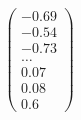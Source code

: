 \documentclass[preview]{standalone}
\begin{document}
\begin{align*}
\begin{pmatrix} -0.69 \\ -0.54 \\ -0.73 \\ \dots \\ 0.07 \\ 0.08 \\ 0.6 \end{pmatrix}
\end{align*}
\end{document}
